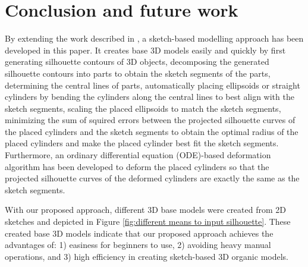 \documentclass[runningheads]{llncs}
\begin{document}
\section{Conclusion and future work}\label{Conclusion and future work}
By extending the work described in \cite{li2017bendsketch}, a sketch-based modelling approach has been developed in this paper. It creates base 3D models easily and quickly by first generating silhouette contours of 3D objects, decomposing the generated silhouette contours into parts to obtain the sketch segments of the parts, determining the central lines of parts, automatically placing ellipsoids or straight cylinders by bending the cylinders along the central lines to best align with the sketch segments, scaling the placed ellipsoids to match the sketch segments, minimizing the sum of squired errors between the projected silhouette curves of the placed cylinders and the sketch segments to obtain the optimal radius of the placed cylinders and make the placed cylinder best fit the sketch segments. Furthermore, an ordinary differential equation (ODE)-based deformation algorithm has been developed to deform the placed cylinders so that the projected silhouette curves of the deformed cylinders are exactly the same as the sketch segments.

With our proposed approach, different 3D base models were created from 2D sketches and depicted in Figure \ref{fig:different means to input silhouette}. These created base 3D models indicate that our proposed approach achieves the advantages of: 1) easiness for beginners to use, 2) avoiding heavy manual operations, and 3) high efficiency in creating sketch-based 3D organic models.
\end{document}
